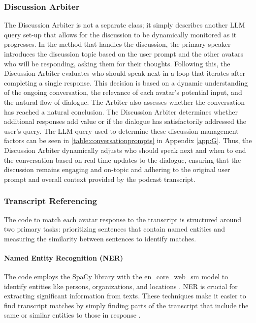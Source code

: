 \documentclass[12pt]{report}
\begin{document}
\begin{myfont}
        \subsubsection{Discussion Arbiter}
        \indent The Discussion Arbiter is not a separate class; it simply describes another LLM query set-up that allows for the discussion to be dynamically monitored as it progresses. In the method that handles the discussion, the primary speaker introduces the discussion topic based on the user prompt and the other avatars who will be responding, asking them for their thoughts. Following this, the Discussion Arbiter evaluates who should speak next in a loop that iterates after completing a single response. This decision is based on a dynamic understanding of the ongoing conversation, the relevance of each avatar's potential input, and the natural flow of dialogue. The Arbiter also assesses whether the conversation has reached a natural conclusion. The Discussion Arbiter determines whether additional responses add value or if the dialogue has satisfactorily addressed the user's query. The LLM query used to determine these discussion management factors can be seen in \ref{table:conversationprompts} in Appendix \ref{app:G}. Thus, the Discussion Arbiter dynamically adjusts who should speak next and when to end the conversation based on real-time updates to the dialogue, ensuring that the discussion remains engaging and on-topic and adhering to the original user prompt and overall context provided by the podcast transcript.
        
        \subsubsection{Transcript Referencing}
        \indent The code to match each avatar response to the transcript is structured around two primary tasks: prioritizing sentences that contain named entities and measuring the similarity between sentences to identify matches.
        
        \paragraph{Named Entity Recognition (NER)} The code employs the SpaCy library with the en\_core\_web\_sm model to identify entities like persons, organizations, and locations \citep{spacy}. NER is crucial for extracting significant information from texts. These techniques make it easier to find transcript matches by simply finding parts of the transcript that include the same or similar entities to those in response \citep{mohit2014named}.
        

\end{myfont}
\end{document}
